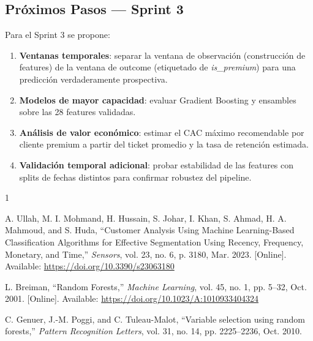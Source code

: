 \documentclass[journal,letterpaper]{IEEEtran}
\begin{document}
\subsection{Próximos Pasos — Sprint 3}
Para el Sprint 3 se propone:
\begin{enumerate}
    \item \textbf{Ventanas temporales}: separar la ventana de observación (construcción de features) de la ventana de outcome (etiquetado de \textit{is\_premium}) para una predicción verdaderamente prospectiva.
    \item \textbf{Modelos de mayor capacidad}: evaluar Gradient Boosting y ensambles sobre las 28 features validadas.
    \item \textbf{Análisis de valor económico}: estimar el CAC máximo recomendable por cliente premium a partir del ticket promedio y la tasa de retención estimada.
    \item \textbf{Validación temporal adicional}: probar estabilidad de las features con splits de fechas distintos para confirmar robustez del pipeline.
\end{enumerate}

\begin{thebibliography}{1}

A. Ullah, M. I. Mohmand, H. Hussain, S. Johar, I. Khan, S. Ahmad, H. A. Mahmoud, and S. Huda,
``Customer Analysis Using Machine Learning-Based Classification Algorithms for Effective Segmentation Using Recency, Frequency, Monetary, and Time,''
\emph{Sensors}, vol. 23, no. 6, p. 3180, Mar. 2023. [Online]. Available: \url{https://doi.org/10.3390/s23063180}

L. Breiman,
``Random Forests,''
\emph{Machine Learning}, vol. 45, no. 1, pp. 5--32, Oct. 2001. [Online]. Available: \url{https://doi.org/10.1023/A:1010933404324}

C. Genuer, J.-M. Poggi, and C. Tuleau-Malot,
``Variable selection using random forests,''
\emph{Pattern Recognition Letters}, vol. 31, no. 14, pp. 2225--2236, Oct. 2010.

\end{thebibliography}
\end{document}

